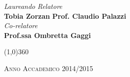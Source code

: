 \documentclass[a4paper, 12pt, twoside, openright]{book}
\begin{document}
\begin{titlepage}
\vfill
\begin{normalsize}
\begin{flushleft}
  \hspace{45pt} \textit{Laureando} \hspace{160pt} \textit{Relatore}\\
  \vspace{5pt}
  \hspace{30pt} \large{\textbf{Tobia Zorzan}} \hspace{70pt} \large{\textbf{Prof. Claudio Palazzi}}\\
  \vspace{10pt}
  \hspace{260pt} \normalsize{\textit{Co-relatore}}\\
  \vspace{5pt}
  \hspace{200pt} \large{\textbf{Prof.ssa Ombretta Gaggi}}
\end{flushleft}
\end{normalsize}

\vfill
\begin{center}
\hspace{-0.2cm}
\begin{center}
\line(1,0){360}
\end{center}

\textsc{Anno Accademico 2014/2015}
\end{center}
\end{titlepage}







\begingroup %
  \makeatletter
  \let\ps@plain\ps@empty
  \makeatother
  \tableofcontents
  \clearpage
\endgroup
\end{document}
